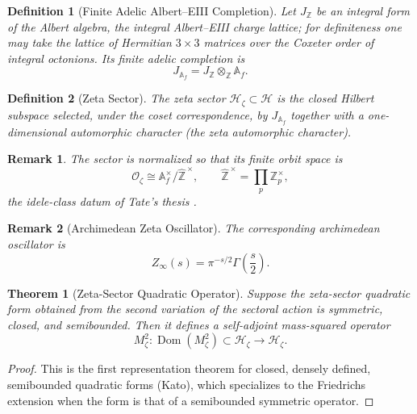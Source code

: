 \documentclass[pdflatex,sn-mathphys-num]{sn-jnl}
\theoremstyle{thmstyleone}
\newtheorem{theorem}{Theorem}
\theoremstyle{thmstylethree}%
\newtheorem{definition}[definition]{Definition}
\theoremstyle{thmstyletwo}%
\newtheorem{remark}[remark]{Remark}
\begin{document}
\begin{definition}[Finite Adelic Albert--EIII Completion]
\label{def:FiniteAdelic}
Let \(J_{\mathbb Z}\) be an integral form of the Albert algebra, the
\emph{integral Albert--EIII charge lattice}; for definiteness one may take the
lattice of Hermitian $3\times3$ matrices over the Coxeter order of integral
octonions. Its finite adelic completion is
\[
  J_{\mathbb A_f}
  =
  J_{\mathbb Z}\otimes_{\mathbb Z}\mathbb A_f .
\]
\end{definition}

\begin{definition}[Zeta Sector]
\label{def:ZetaSector}
The \emph{zeta sector} \(\mathcal H_\zeta\subset\mathcal H\) is the closed
Hilbert subspace selected, under the coset correspondence, by
\(J_{\mathbb A_f}\) together with a one-dimensional automorphic character (the
\emph{zeta automorphic character}).
\end{definition}

\begin{remark}
  The sector is normalized so that its finite
  orbit space is
  \[
    \mathcal O_{\zeta}
    \cong
    \mathbb A_f^\times/\widehat{\mathbb Z}^{\,\times},
    \qquad
    \widehat{\mathbb Z}^{\,\times}
    =
    \prod_p \mathbb Z_p^\times ,
  \]
  the idele-class datum of Tate's thesis \cite{Tate1967}.
\end{remark}

\begin{remark}[Archimedean Zeta Oscillator]
The corresponding archimedean oscillator is
\[
  Z_\infty(s)
  =
  \pi^{-s/2}\Gamma\left(\frac{s}{2}\right).
\]
\end{remark}

\begin{theorem}[Zeta-Sector Quadratic Operator]
\label{thm:ZetaQuadraticOperator}
Suppose the zeta-sector quadratic form obtained from the second variation of
the sectoral action is symmetric, closed, and semibounded. Then it defines a
self-adjoint mass-squared operator
\[
  M_\zeta^2:\operatorname{Dom}(M_\zeta^2)\subset\mathcal H_\zeta
  \longrightarrow\mathcal H_\zeta .
\]
\end{theorem}

\begin{proof}
This is the first representation theorem for closed, densely defined,
semibounded quadratic forms (Kato), which specializes to the Friedrichs
extension when the form is that of a semibounded symmetric operator.
\end{proof}
\end{document}
